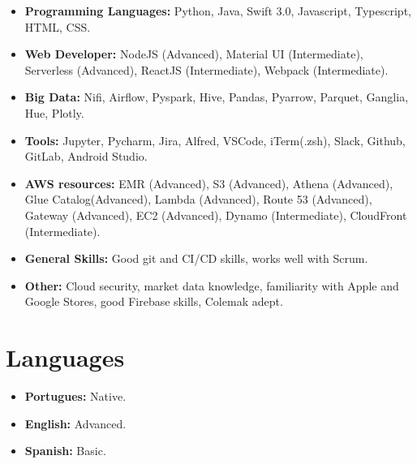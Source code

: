 \documentclass[10pt,a4paper,sans]{moderncv}
\begin{document}
\begin{itemize}

\item \textbf{Programming Languages:} Python, Java, Swift 3.0, Javascript, Typescript, HTML, CSS.
\vspace{6pt}

\item \textbf{Web Developer:} NodeJS (Advanced), Material UI (Intermediate), Serverless (Advanced), ReactJS (Intermediate), Webpack (Intermediate).
\vspace{6pt}

\item \textbf{Big Data:} Nifi, Airflow, Pyspark, Hive, Pandas, Pyarrow, Parquet, Ganglia, Hue, Plotly.
\vspace{6pt}

\item \textbf{Tools:} Jupyter, Pycharm, Jira, Alfred, VSCode, iTerm(.zsh), Slack, Github, GitLab, Android Studio.
\vspace{6pt}

\item \textbf{AWS resources:} EMR (Advanced), S3 (Advanced), Athena (Advanced), Glue Catalog(Advanced), Lambda (Advanced), Route 53 (Advanced),  Gateway (Advanced), EC2 (Advanced), Dynamo (Intermediate), CloudFront (Intermediate).
\vspace{6pt}

\item \textbf{General Skills:} Good git and CI/CD skills, works well with Scrum.
\vspace{6pt}

\item \textbf{Other:} Cloud security, market data knowledge, familiarity with Apple and Google Stores, good Firebase skills, Colemak adept.
\vspace{6pt}

\end{itemize}

\section{Languages}
\vspace{6pt}

\begin{itemize}

\item \textbf{Portugues:} Native.
\vspace{6pt}

\item \textbf{English:} Advanced.
\vspace{6pt}

\item \textbf{Spanish:} Basic.
\vspace{6pt}

\end{itemize}
\end{document}
